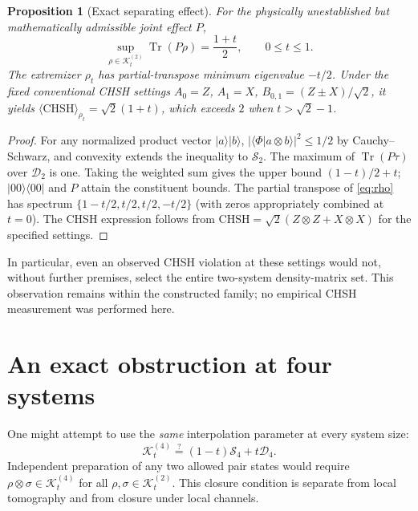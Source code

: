 \documentclass[11pt,letterpaper]{article}
\newtheorem{proposition}[theorem]{Proposition}
\newcommand{\D}{\mathcal{D}}
\newcommand{\Ssep}{\mathcal{S}}
\newcommand{\K}{\mathcal{K}}
\newcommand{\tr}{\operatorname{Tr}}
\begin{document}
\begin{proposition}[Exact separating effect]\label{prop:bell}
For the physically unestablished but mathematically admissible joint effect $P$,
\[
\sup_{\rho\in\K_t^{(2)}}\tr(P\rho)=\frac{1+t}{2},
\qquad 0\leq t\leq1.
\]
The extremizer $\rho_t$ has partial-transpose minimum eigenvalue $-t/2$.
Under the fixed conventional CHSH settings $A_0=Z$, $A_1=X$,
$B_{0,1}=(Z\pm X)/\sqrt{2}$, it yields
$\langle\mathrm{CHSH}\rangle_{\rho_t}=\sqrt{2}(1+t)$, which exceeds $2$
when $t>\sqrt{2}-1$.
\end{proposition}
\begin{proof}
For any normalized product vector $|a\rangle|b\rangle$,
$|\langle\Phi|a\otimes b\rangle|^2\leq1/2$ by Cauchy--Schwarz, and
convexity extends the inequality to $\Ssep_2$. The maximum of $\tr(P\tau)$
over $\D_2$ is one. Taking the weighted sum gives the upper bound
$(1-t)/2+t$; $|00\rangle\langle00|$ and $P$ attain the constituent bounds.
The partial transpose of \eqref{eq:rho} has spectrum
$\{1-t/2,t/2,t/2,-t/2\}$ (with zeros appropriately combined at $t=0$).
The CHSH expression follows from $\mathrm{CHSH}=\sqrt{2}(Z\otimes Z+X\otimes X)$
for the specified settings. \end{proof}

In particular, even an observed CHSH violation at these settings would not,
without further premises, select the entire two-system density-matrix set.
This observation remains within the constructed family; no empirical CHSH
measurement was performed here.

\section{An exact obstruction at four systems}
One might attempt to use the \emph{same} interpolation parameter at every
system size:
\begin{equation}\label{eq:naive}
\K_t^{(4)}\stackrel{?}{=}(1-t)\Ssep_4+t\D_4.
\end{equation}
Independent preparation of any two allowed pair states would require
$\rho\otimes\sigma\in\K_t^{(4)}$ for all
$\rho,\sigma\in\K_t^{(2)}$. This closure condition is separate from local
tomography and from closure under local channels.
\end{document}
